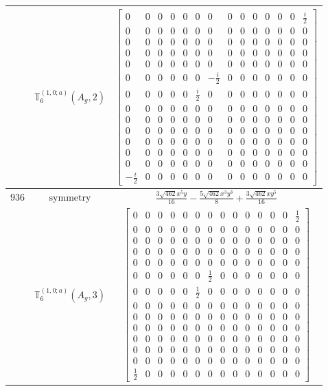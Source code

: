 \documentclass[fleqn,8pt,landscape]{jsarticle}
\begin{document}
\begin{longtable}{ccc}
$  $ & $ \mathbb{T}_{6}^{(1,0;a)}(A_{g},2) $ & $ \begin{bmatrix} 0 & 0 & 0 & 0 & 0 & 0 & 0 & 0 & 0 & 0 & 0 & 0 & 0 & \frac{i}{2} \\ 0 & 0 & 0 & 0 & 0 & 0 & 0 & 0 & 0 & 0 & 0 & 0 & 0 & 0 \\ 0 & 0 & 0 & 0 & 0 & 0 & 0 & 0 & 0 & 0 & 0 & 0 & 0 & 0 \\ 0 & 0 & 0 & 0 & 0 & 0 & 0 & 0 & 0 & 0 & 0 & 0 & 0 & 0 \\ 0 & 0 & 0 & 0 & 0 & 0 & 0 & 0 & 0 & 0 & 0 & 0 & 0 & 0 \\ 0 & 0 & 0 & 0 & 0 & 0 & - \frac{i}{2} & 0 & 0 & 0 & 0 & 0 & 0 & 0 \\ 0 & 0 & 0 & 0 & 0 & \frac{i}{2} & 0 & 0 & 0 & 0 & 0 & 0 & 0 & 0 \\ 0 & 0 & 0 & 0 & 0 & 0 & 0 & 0 & 0 & 0 & 0 & 0 & 0 & 0 \\ 0 & 0 & 0 & 0 & 0 & 0 & 0 & 0 & 0 & 0 & 0 & 0 & 0 & 0 \\ 0 & 0 & 0 & 0 & 0 & 0 & 0 & 0 & 0 & 0 & 0 & 0 & 0 & 0 \\ 0 & 0 & 0 & 0 & 0 & 0 & 0 & 0 & 0 & 0 & 0 & 0 & 0 & 0 \\ 0 & 0 & 0 & 0 & 0 & 0 & 0 & 0 & 0 & 0 & 0 & 0 & 0 & 0 \\ 0 & 0 & 0 & 0 & 0 & 0 & 0 & 0 & 0 & 0 & 0 & 0 & 0 & 0 \\ - \frac{i}{2} & 0 & 0 & 0 & 0 & 0 & 0 & 0 & 0 & 0 & 0 & 0 & 0 & 0 \end{bmatrix} $ \\ \hline
$ 936 $ & $ \text{symmetry} $ & $ \frac{3 \sqrt{462} x^{5} y}{16} - \frac{5 \sqrt{462} x^{3} y^{3}}{8} + \frac{3 \sqrt{462} x y^{5}}{16} $ \\
$  $ & $ \mathbb{T}_{6}^{(1,0;a)}(A_{g},3) $ & $ \begin{bmatrix} 0 & 0 & 0 & 0 & 0 & 0 & 0 & 0 & 0 & 0 & 0 & 0 & 0 & \frac{1}{2} \\ 0 & 0 & 0 & 0 & 0 & 0 & 0 & 0 & 0 & 0 & 0 & 0 & 0 & 0 \\ 0 & 0 & 0 & 0 & 0 & 0 & 0 & 0 & 0 & 0 & 0 & 0 & 0 & 0 \\ 0 & 0 & 0 & 0 & 0 & 0 & 0 & 0 & 0 & 0 & 0 & 0 & 0 & 0 \\ 0 & 0 & 0 & 0 & 0 & 0 & 0 & 0 & 0 & 0 & 0 & 0 & 0 & 0 \\ 0 & 0 & 0 & 0 & 0 & 0 & \frac{1}{2} & 0 & 0 & 0 & 0 & 0 & 0 & 0 \\ 0 & 0 & 0 & 0 & 0 & \frac{1}{2} & 0 & 0 & 0 & 0 & 0 & 0 & 0 & 0 \\ 0 & 0 & 0 & 0 & 0 & 0 & 0 & 0 & 0 & 0 & 0 & 0 & 0 & 0 \\ 0 & 0 & 0 & 0 & 0 & 0 & 0 & 0 & 0 & 0 & 0 & 0 & 0 & 0 \\ 0 & 0 & 0 & 0 & 0 & 0 & 0 & 0 & 0 & 0 & 0 & 0 & 0 & 0 \\ 0 & 0 & 0 & 0 & 0 & 0 & 0 & 0 & 0 & 0 & 0 & 0 & 0 & 0 \\ 0 & 0 & 0 & 0 & 0 & 0 & 0 & 0 & 0 & 0 & 0 & 0 & 0 & 0 \\ 0 & 0 & 0 & 0 & 0 & 0 & 0 & 0 & 0 & 0 & 0 & 0 & 0 & 0 \\ \frac{1}{2} & 0 & 0 & 0 & 0 & 0 & 0 & 0 & 0 & 0 & 0 & 0 & 0 & 0 \end{bmatrix} $ \\ \hline

\end{longtable}
\end{document}
